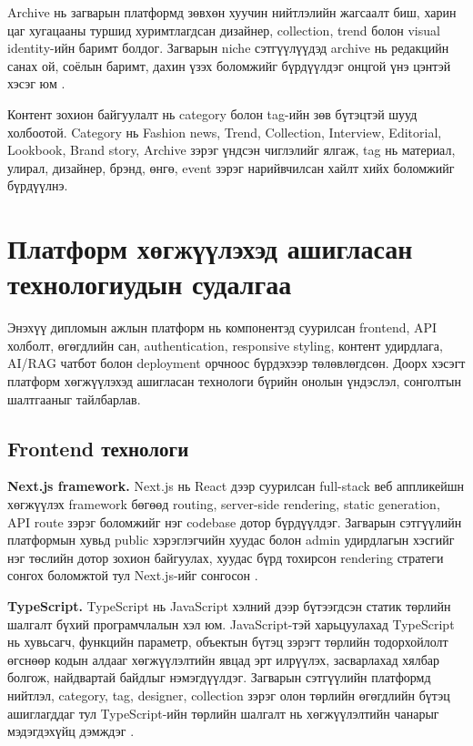 Archive нь загварын платформд зөвхөн хуучин нийтлэлийн жагсаалт биш, харин цаг хугацааны туршид хуримтлагдсан дизайнер, collection, trend болон visual identity-ийн баримт болдог. Загварын niche сэтгүүлүүдэд archive нь редакцийн санах ой, соёлын баримт, дахин үзэх боломжийг бүрдүүлдэг онцгой үнэ цэнтэй хэсэг юм \cite{lynge_jorlen_2012}.

Контент зохион байгуулалт нь category болон tag-ийн зөв бүтэцтэй шууд холбоотой. Category нь Fashion news, Trend, Collection, Interview, Editorial, Lookbook, Brand story, Archive зэрэг үндсэн чиглэлийг ялгаж, tag нь материал, улирал, дизайнер, брэнд, өнгө, event зэрэг нарийвчилсан хайлт хийх боломжийг бүрдүүлнэ.

\section{Платформ хөгжүүлэхэд ашигласан технологиудын судалгаа}

Энэхүү дипломын ажлын платформ нь компонентэд суурилсан frontend, API холболт, өгөгдлийн сан, authentication, responsive styling, контент удирдлага, AI/RAG чатбот болон deployment орчноос бүрдэхээр төлөвлөгдсөн. Доорх хэсэгт платформ хөгжүүлэхэд ашигласан технологи бүрийн онолын үндэслэл, сонголтын шалтгааныг тайлбарлав.

\subsection*{Frontend технологи}

\textbf{Next.js framework.} Next.js нь React дээр суурилсан full-stack веб аппликейшн хөгжүүлэх framework бөгөөд routing, server-side rendering, static generation, API route зэрэг боломжийг нэг codebase дотор бүрдүүлдэг. Загварын сэтгүүлийн платформын хувьд public хэрэглэгчийн хуудас болон admin удирдлагын хэсгийг нэг төслийн дотор зохион байгуулах, хуудас бүрд тохирсон rendering стратеги сонгох боломжтой тул Next.js-ийг сонгосон \cite{nextjs_docs}.

\textbf{TypeScript.} TypeScript нь JavaScript хэлний дээр бүтээгдсэн статик төрлийн шалгалт бүхий програмчлалын хэл юм. JavaScript-тэй харьцуулахад TypeScript нь хувьсагч, функцийн параметр, объектын бүтэц зэрэгт төрлийн тодорхойлолт өгснөөр кодын алдааг хөгжүүлэлтийн явцад эрт илрүүлэх, засварлахад хялбар болгож, найдвартай байдлыг нэмэгдүүлдэг. Загварын сэтгүүлийн платформд нийтлэл, category, tag, designer, collection зэрэг олон төрлийн өгөгдлийн бүтэц ашиглагддаг тул TypeScript-ийн төрлийн шалгалт нь хөгжүүлэлтийн чанарыг мэдэгдэхүйц дэмждэг \cite{typescript_docs}.

